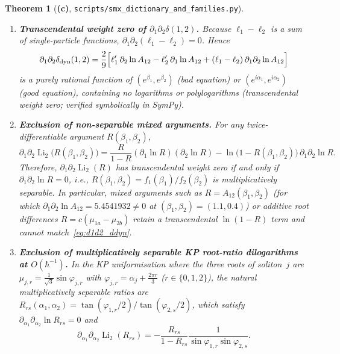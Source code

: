 \documentclass[11pt,a4paper]{article}
\newcommand{\Lc}{\textsf{\textbf{(c)}}}
\newcommand{\script}[1]{\texttt{scripts/\allowbreak #1}}
\DeclareMathOperator{\Li}{Li}
\newtheorem{theorem}[proposition]{Theorem}
\theoremstyle{remark}
\begin{document}
\begin{theorem}[\Lc, \script{smx\_dictionary\_and\_families.py}]\label{thm:fam3}
\begin{enumerate}
\item \textbf{Transcendental weight zero of $\partial_1\partial_2\delta(1,2)$.}
Because $\ell_1-\ell_2$ is a sum of single-particle functions, $\partial_1\partial_2(\ell_1-\ell_2)=0$. Hence
\begin{equation}\label{eq:d1d2_ddyn}
\partial_1\partial_2\delta_{\rm dyn}(1,2)
=\frac29\Bigl[\ell_1'\,\partial_2\ln A_{12}-\ell_2'\,\partial_1\ln A_{12}+(\ell_1-\ell_2)\,\partial_1\partial_2\ln A_{12}\Bigr]
\end{equation}
is a purely rational function of $(e^{\beta_1},e^{\beta_2})$ (bad equation) or $(e^{i\alpha_1},e^{i\alpha_2})$ (good equation), containing \emph{no logarithms or polylogarithms} (transcendental weight zero; verified symbolically in SymPy).
\item \textbf{Exclusion of non-separable mixed arguments.}
For any twice-differentiable argument $R(\beta_1,\beta_2)$,
\begin{equation}\label{eq:d1d2_Li2}
\partial_1\partial_2\Li_2\bigl(R(\beta_1,\beta_2)\bigr)
=\frac{R}{1-R}(\partial_1\ln R)(\partial_2\ln R)-\ln\bigl(1-R(\beta_1,\beta_2)\bigr)\,\partial_1\partial_2\ln R.
\end{equation}
Therefore, $\partial_1\partial_2\Li_2(R)$ has transcendental weight zero if and only if $\partial_1\partial_2\ln R=0$, i.e., $R(\beta_1,\beta_2)=f_1(\beta_1)/f_2(\beta_2)$ is multiplicatively separable. In particular, mixed arguments such as $R=A_{12}(\beta_1,\beta_2)$ (for which $\partial_1\partial_2\ln A_{12}=5.4541932\neq 0$ at $(\beta_1,\beta_2)=(1.1,0.4)$) or additive root differences $R=c(\mu_{1a}-\mu_{2b})$ retain a transcendental $\ln(1-R)$ term and cannot match~\eqref{eq:d1d2_ddyn}.
\item \textbf{Exclusion of multiplicatively separable KP root-ratio dilogarithms at $O(\hbar^{-1})$.}
In the KP uniformisation where the three roots of soliton~$j$ are $\mu_{j,r}=\frac{1}{\sqrt3}\sin\varphi_{j,r}$ with $\varphi_{j,r}=\alpha_j+\frac{2\pi r}{3}$ ($r\in\{0,1,2\}$), the natural multiplicatively separable ratios are $R_{rs}(\alpha_1,\alpha_2)=\tan(\varphi_{1,r}/2)/\tan(\varphi_{2,s}/2)$, which satisfy $\partial_{\alpha_1}\partial_{\alpha_2}\ln R_{rs}=0$ and
\begin{equation}\label{eq:d1d2_Li2_KP}
\partial_{\alpha_1}\partial_{\alpha_2}\Li_2(R_{rs})=-\frac{R_{rs}}{1-R_{rs}}\frac{1}{\sin\varphi_{1,r}\sin\varphi_{2,s}}.

\end{equation}
\end{enumerate}
\end{theorem}
\end{document}
